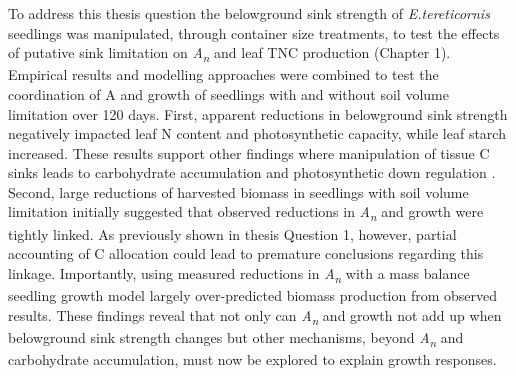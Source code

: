 \documentclass[a4paper]{article}
\begin{document}
To address this thesis question the belowground sink strength of \textit{E.tereticornis} seedlings was manipulated, through container size treatments, to test the effects of putative sink limitation on \textit{A\textsubscript{n}} and leaf TNC production (Chapter 1). Empirical results and modelling approaches were combined to test the coordination of A and growth of seedlings with and without soil volume limitation over 120 days. First, apparent reductions in belowground sink strength negatively impacted leaf N content and photosynthetic capacity, while leaf starch increased. These results support other findings where manipulation of tissue C sinks leads to carbohydrate accumulation and photosynthetic down regulation \citep{hoch2002altitudinal, iglesias2002regulation, equiza2006photosynthetic, urban2007girdling;, haouari2013fruit}. Second, large reductions of harvested biomass in seedlings with soil volume limitation initially suggested that observed reductions in \textit{A\textsubscript{n}} and growth were tightly linked. As previously shown in thesis Question 1, however, partial accounting of C allocation could lead to premature conclusions regarding this linkage. Importantly, using measured reductions in \textit{A\textsubscript{n}} with a mass balance seedling growth model largely over-predicted biomass production from observed results. These findings reveal that not only can \textit{A\textsubscript{n}} and growth not add up when belowground sink strength changes but other mechanisms, beyond \textit{A\textsubscript{n}} and carbohydrate accumulation, must now be explored to explain growth responses.
\end{document}
